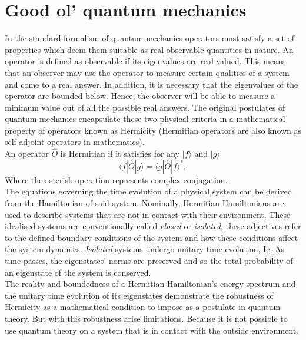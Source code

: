 \documentclass[10pt, a4paper, singlespacing]{report}
\begin{document}
\section{Good ol' quantum mechanics}\label{QM}
In the standard formalism of quantum mechanics operators must satisfy a set of properties which deem them suitable as real observable quantities in nature.
An operator is defined as observable if its eigenvalues are real valued. This means that an observer may use the operator to measure certain qualities of a system and come to a real answer. In addition, it is necessary that the eigenvalues of the operator are bounded below. Hence, the observer will be able to measure a minimum value out of all the possible real answers. 
The original postulates of quantum mechanics encapsulate these two physical criteria in a mathematical property of operators known as Hermicity (Hermitian operators are also known as self-adjoint operators in mathematics).\\
An operator $\hat{O}$ is Hermitian if it satisfies for any $|f \rangle$ and $|g\rangle$
\begin{equation} \label{eq:1}
\langle f|\widehat{O}|g\rangle = \langle g|\widehat{O}|f \rangle^{*},
\end{equation}
Where the asterisk operation represents complex conjugation.\\
The equations governing the time evolution of a physical system can be derived from the Hamiltonian of said system\cite{BenderPT}. Nominally, Hermitian Hamiltonians are used to describe systems that are not in contact with their environment. These idealised systems are conventionally called \emph{closed} or \emph{isolated}, these adjectives refer to the defined boundary conditions of the system and how these conditions affect the system dynamics. \emph{Isolated} systems undergo unitary time evolution, Ie. As time passes, the eigenstates' norms are preserved and so the total probability of an eigenstate of the system is conserved. 
\\The reality and boundedness of a Hermitian Hamiltonian's energy spectrum and the unitary time evolution of its eigenstates demonstrate the robustness of Hermicity as a mathematical condition to impose as a postulate in quantum theory.
But with this robustness arise limitations. Because it is not possible to use quantum theory on a system that is in contact with the outside environment.
\end{document}
